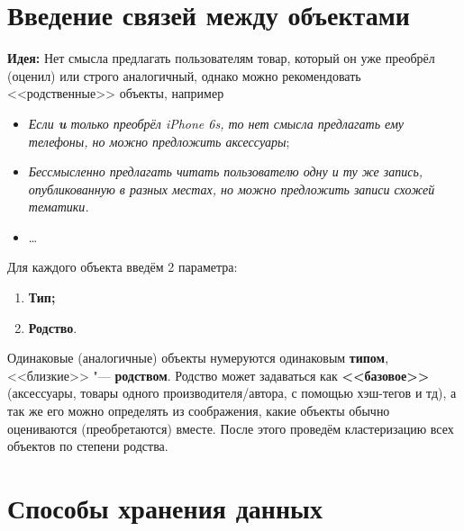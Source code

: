 \documentclass[a4paper,14pt]{article}
\begin{document}
\section{Введение связей между объектами} 
{\bf Идея:} Нет смысла предлагать пользователям товар, который он уже преобрёл (оценил) или строго аналогичный, однако можно рекомендовать <<родственные>> объекты, например
\begin{itemize}
\item {\it Если {\bf u} только преобрёл iPhone 6s, то нет смысла предлагать ему телефоны, но можно предложить аксессуары};
\item {\it Бессмысленно предлагать читать пользователю одну и ту же запись, опубликованную в разных местах, но можно предложить записи схожей тематики.}
\item \dots
\end{itemize}

Для каждого объекта введём 2 параметра:
\begin{enumerate}
\item {\bf Тип;}
\item {\bf Родство}.
\end{enumerate}

Одинаковые (аналогичные) объекты нумеруются одинаковым {\bf типом}, <<близкие>> "--- {\bf родством}. Родство может задаваться как {\bf <<базовое>>} (аксессуары, товары одного производителя/автора, с помощью хэш-тегов и тд), а так же его можно определять из соображения, какие объекты обычно оцениваются (преобретаются) вместе. После этого проведём кластеризацию всех объектов по степени родства.

\section{Способы хранения данных}
\end{document}
